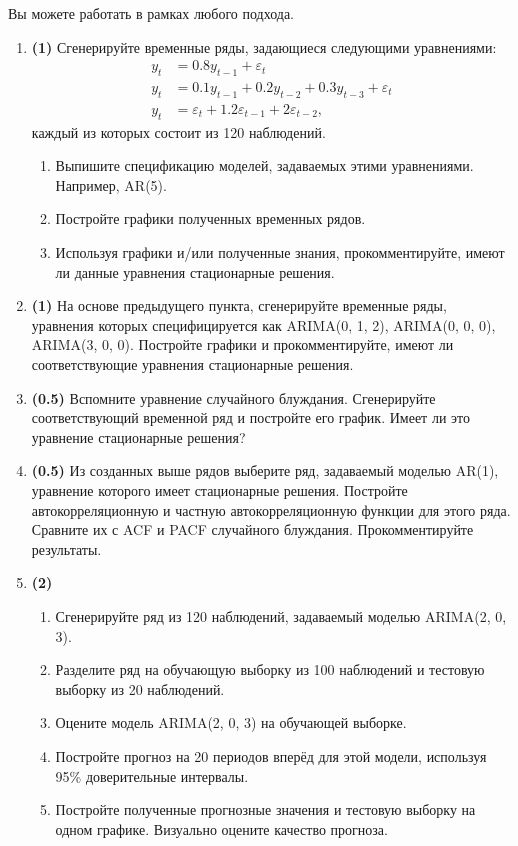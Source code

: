 \documentclass[10pt, a4paper]{extarticle}
\begin{document}
Вы можете работать в рамках любого подхода.

\begin{enumerate}
	\item \textbf{(1)} Сгенерируйте временные ряды, задающиеся следующими уравнениями:
	\begin{align*}
		y_t &= 0.8y_{t-1} + \varepsilon_{t} \\
		y_t &= 0.1y_{t-1} + 0.2y_{t-2} + 0.3y_{t-3} + \varepsilon_t \\
		y_t &= \varepsilon_t + 1.2\varepsilon_{t-1} + 2\varepsilon_{t-2},
	\end{align*}
	 каждый из которых состоит из 120 наблюдений. 
	\begin{enumerate}
		\item Выпишите спецификацию моделей, задаваемых этими уравнениями. Например, AR(5).
		\item Постройте графики полученных временных рядов. 
		\item Используя графики и/или полученные знания, прокомментируйте, имеют ли данные уравнения стационарные решения. 
	\end{enumerate}
	\item \textbf{(1)} На основе предыдущего пункта, сгенерируйте временные ряды, уравнения которых специфицируется как ARIMA(0, 1, 2), ARIMA(0, 0, 0), ARIMA(3, 0, 0). Постройте графики и прокомментируйте, имеют ли соответствующие уравнения стационарные решения. 
	\item \textbf{(0.5)} Вспомните уравнение случайного блуждания. Сгенерируйте соответствующий временной ряд и постройте его график. Имеет ли это уравнение стационарные решения? 
	\item \textbf{(0.5)} Из созданных выше рядов выберите ряд, задаваемый моделью AR(1), уравнение которого имеет стационарные решения. Постройте автокорреляционную и частную автокорреляционную функции для этого ряда. Сравните их с ACF и PACF случайного блуждания. Прокомментируйте результаты. 
	
	\item \textbf{(2)}\begin{enumerate}
		\item Сгенерируйте ряд из 120 наблюдений, задаваемый моделью ARIMA(2, 0, 3).
		\item Разделите ряд на обучающую выборку из 100 наблюдений и тестовую выборку из 20 наблюдений.
		\item Оцените модель ARIMA(2, 0, 3) на обучающей выборке.
		\item Постройте прогноз на 20 периодов вперёд для этой модели, используя 95\% доверительные интервалы.
		\item Постройте полученные прогнозные значения и тестовую выборку на одном графике. Визуально оцените качество прогноза.
	\end{enumerate}
\end{enumerate}
\end{document}
